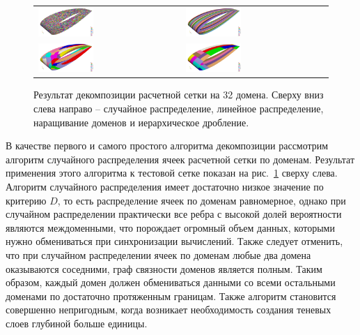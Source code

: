 \begin{figure}[ht]
\centering
\begin{tabular}{ll}
\includegraphics[width=0.4\textwidth]{fig/par_wing_random_32.png}
&
\includegraphics[width=0.4\textwidth]{fig/par_wing_linear_32.png}
\\
\includegraphics[width=0.4\textwidth]{fig/par_wing_rgrow_32.png}
&
\includegraphics[width=0.4\textwidth]{fig/par_wing_hierarchical_32.png}
\end{tabular}
\singlespacing
{}\caption{Результат декомпозиции расчетной сетки на 32 домена. Сверху вниз слева направо -- случайное распределение, линейное распределение, наращивание доменов и иерархическое дробление.}
\label{fig:text_2_decompsurf_4}
\end{figure}

В качестве первого и самого простого алгоритма декомпозиции рассмотрим алгоритм случайного распределения ячеек расчетной сетки по доменам.
Результат применения этого алгоритма к тестовой сетке показан на рис.~\ref{fig:text_2_decompsurf_4} сверху слева.
Алгоритм случайного распределения имеет достаточно низкое значение по критерию $D$, то есть распределение ячеек по доменам равномерное, однако при случайном распределении практически все ребра с высокой долей вероятности являются междоменными, что порождает огромный объем данных, которыми нужно обмениваться при синхронизации вычислений.
Также следует отменить, что при случайном распределении ячеек по доменам любые два домена оказываются соседними, граф связности доменов является полным.
Таким образом, каждый домен должен обмениваться данными со всеми остальными доменами по достаточно протяженным границам.
Также алгоритм становится совершенно непригодным, когда возникает необходимость создания теневых слоев глубиной больше единицы.

